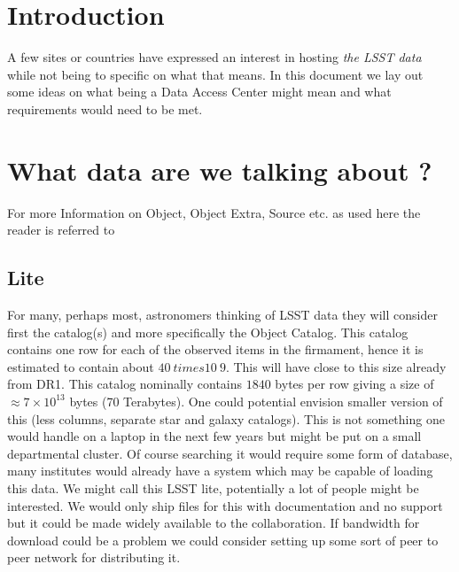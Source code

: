 
\section{Introduction}

A few sites or countries have expressed an interest in hosting {\em the LSST data} while not being to specific on what that means.
In this document we lay out some ideas on what being a Data Access Center might mean and what requirements would need to be met.


\section{What data are we talking about ?}

For more Information on Object, Object Extra, Source etc. as used here the reader is referred to \DPDD {}

\subsection{Lite}
For many, perhaps most, astronomers thinking of LSST data they will consider first the catalog(s) and more specifically the Object Catalog.
This catalog contains one row for each of the observed items in the firmament, hence it is estimated to contain about $40 ~times 10~{9}$. This will have close to this size already from DR1.
This catalog nominally contains $1840$ bytes per row giving a size of $\approx 7 \times 10^{13}$ bytes (70 Terabytes). One could potential envision smaller version of this (less columns, separate star and galaxy catalogs). This is not something one would handle on a laptop in the next few years but might be put on a small departmental cluster.
Of course searching it would require some form of database, many institutes would already have a system which may be capable of loading this data.
We might call this LSST lite, potentially a lot of people might be interested. We would only ship files for this with documentation and no support but it could be made widely available to the collaboration. If bandwidth for download could be a problem we could consider setting up some sort of peer to peer network for distributing it.

